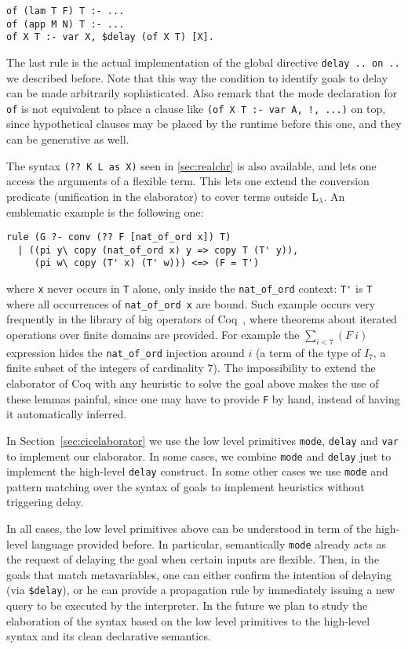 \documentclass{easychair}
\begin{document}
\begin{Verbatim}
of (lam T F) T :- ...
of (app M N) T :- ...
of X T :- var X, $delay (of X T) [X].
\end{Verbatim}

The last rule is the actual implementation of the global directive
\verb+delay .. on ..+ we described before.  Note that this way the
condition to identify goals to delay can be made arbitrarily
sophisticated.
Also remark that the mode declaration for \verb+of+
is not equivalent to
place a clause like \verb+(of X T :- var A, !, ...)+
on top, 
since hypothetical clauses may be placed by the runtime before this one,
and they can be generative as well.

The syntax \verb+(?? K L as X)+ seen in \ref{sec:realchr} is also
available, and lets one access the arguments of a flexible term.
This lets one extend the conversion predicate (unification in the
elaborator) to cover terms outside L$_\lambda$.  An emblematic example is
the following one:

\begin{Verbatim}
rule (G ?- conv (?? F [nat_of_ord x]) T)
  | ((pi y\ copy (nat_of_ord x) y => copy T (T' y)),
     (pi w\ copy (T' x) (T' w))) <=> (F = T')
\end{Verbatim}

\noindent
where \verb+x+ never occurs in \verb+T+ alone, only inside the
\verb+nat_of_ord+ context: \verb+T'+ is \verb+T+ where all occurrences
of \verb+nat_of_ord x+ are bound.  Such example occurs very frequently
in the library of big operators of Coq~\cite{bigop}, where theorems about iterated
operations over finite domains are provided.
For example the $\sum_{i < 7} (F~i)$ expression hides
the \verb+nat_of_ord+ injection around $i$ (a term of the
type of $I_7$, a finite subset of the integers of cardinality $7$).
The impossibility to extend the elaborator of Coq with any heuristic
to solve the goal above makes the use of these lemmas painful, since
one may have to provide \verb+F+ by hand, instead of having it
automatically inferred.

In Section~\ref{sec:cicelaborator} we use the low level primitives \verb+mode+, \verb+delay+ and \verb+var+ to implement our elaborator. In some cases, we combine \verb+mode+ and \verb+delay+ just to implement the high-level \verb+delay+ construct. In some other cases we use \verb+mode+ and pattern matching over the syntax of goals to implement heuristics without triggering delay. 

In all cases, the low level primitives above can be understood in term of the high-level language provided before. In particular, semantically \verb+mode+ already acts as the request of delaying the goal when certain inputs are flexible. Then, in the goals that match metavariables, one can either confirm the intention of delaying (via \verb+$delay+), or he can provide a propagation rule by immediately issuing a new query to be executed by the interpreter. In the future we plan to study the elaboration of the syntax based on the low level primitives to the high-level syntax and its clean declarative semantics.
\end{document}
